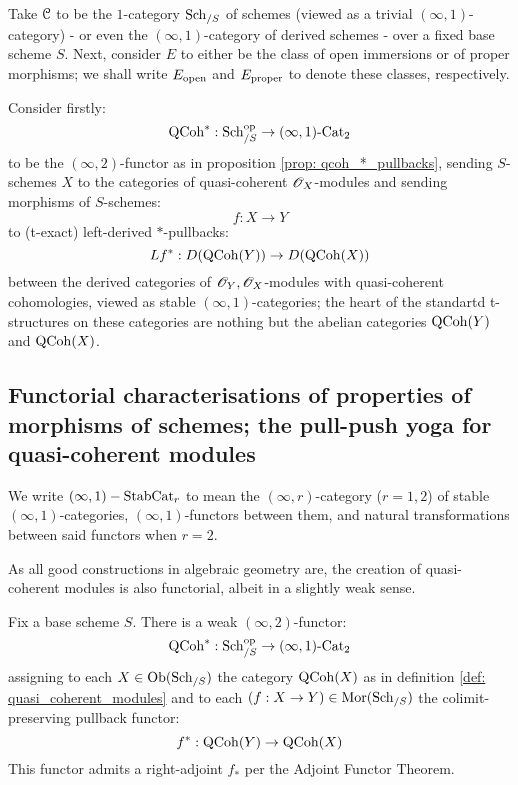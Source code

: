         \begin{example}
            Take $\mathcal{C}$ to be the $1$-category $\mathrm{Sch}_{/S}$ of schemes (viewed as a trivial $(\infty, 1)$-category) - or even the $(\infty, 1)$-category of derived schemes - over a fixed base scheme $S$. Next, consider $E$ to either be the class of open immersions or of proper morphisms; we shall write $E_{\mathrm{open}}$ and $E_{\mathrm{proper}}$ to denote these classes, respectively.

            Consider firstly:
                $$\mathrm{QCoh}^*: \mathrm{Sch}_{/S}^{\mathrm{op}} \to (\infty, 1)\text{-}\mathrm{Cat}_2$$
            to be the $(\infty, 2)$-functor as in proposition \ref{prop: qcoh_*_pullbacks}, sending $S$-schemes $X$ to the categories of quasi-coherent $\mathscr{O}_X$-modules and sending morphisms of $S$-schemes:
                $$f: X \to Y$$
            to (t-exact) left-derived $*$-pullbacks:
                $$Lf^*: D(\mathrm{QCoh}(Y)) \to D(\mathrm{QCoh}(X))$$
            between the derived categories of $\mathscr{O}_Y, \mathscr{O}_X$-modules with quasi-coherent cohomologies, viewed as stable $(\infty, 1)$-categories; the heart of the standartd t-structures on these categories are nothing but the abelian categories $\mathrm{QCoh}(Y)$ and $\mathrm{QCoh}(X)$. 
        \end{example}

    \subsection{Functorial characterisations of properties of morphisms of schemes; the pull-push yoga for quasi-coherent modules}
        \begin{convention}
            We write $(\infty, 1)-\mathrm{Stab}\mathrm{Cat}_r$ to mean the $(\infty, r)$-category ($r = 1, 2$) of stable $(\infty, 1)$-categories, $(\infty, 1)$-functors between them, and natural transformations between said functors when $r = 2$.
        \end{convention}
    
        As all good constructions in algebraic geometry are, the creation of quasi-coherent modules is also functorial, albeit in a slightly weak sense. 
        \begin{proposition} \label{prop: qcoh_*_pullbacks}
            Fix a base scheme $S$. There is a weak $(\infty, 2)$-functor:
                $$\mathrm{QCoh}^*: \mathrm{Sch}_{/S}^{\mathrm{op}} \to (\infty, 1)\text{-}\mathrm{Cat}_2$$
            assigning to each $X \in \mathrm{Ob}(\mathrm{Sch}_{/S})$ the category $\mathrm{QCoh}(X)$ as in definition \ref{def: quasi_coherent_modules} and to each $(f: X \to Y) \in \mathrm{Mor}(\mathrm{Sch}_{/S})$ the colimit-preserving pullback functor:
                $$f^*: \mathrm{QCoh}(Y) \to \mathrm{QCoh}(X)$$
            This functor admits a right-adjoint $f_*$ per the Adjoint Functor Theorem. 
        \end{proposition}

